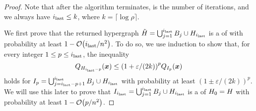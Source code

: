 \begin{proof}


Note that after the algorithm terminates, \ilast is the number of iterations, and we always have \( {i_{\text{last} }} \leq k \), where \( k = \lceil \log \rho \rceil \).

We first prove that the returned hypergraph \( { \tilde H} = \bigcup _{j = 1} ^{i_{\text{last} }} { B_j} \cup {\ensuremath{ H_{i_{\text{last} }}}} \) is a \SpectralHypersparsifier{} of  with probability at least \( 1 - \atmost{\ilast/n^2} \).
To do so, we use induction to show that, for every integer \( 1 \leq p \leq {\ensuremath{i_{\text{last} }}} \), the inequality
\begin{equation} \label{eq:upper_bound}
Q_{\hypergraph{H_{\ilast - p }}}( \vect{x} ) 
\leq
\left( 1 + \varepsilon / (2k) \right)^{p} Q_{\hypergraph{I_{p}}}( \vect{x} )
\end{equation}
holds for \( { I_p} =  \bigcup _{j = {i_{\text{last} }} - p + 1} ^ {i_{\text{last} }} { B_j} \cup {\ensuremath{ H_{i_{\text{last} }}}} \) with probability at least \( (1 \pm \varepsilon /(2k) )^{p} \).
We will use this later to prove that
 \( { I_{i_{\text{last} }}} =  \bigcup _{j = 1} ^ {i_{\text{last} }} { B_j} \cup {\ensuremath{ H_{i_{\text{last} }}}} \) is a 
 \SpectralHypersparsifier{} of \( { H_{0}} = { H} \) with probability at least \( 1 - \atmost{p/n^2} \).


\end{proof}
